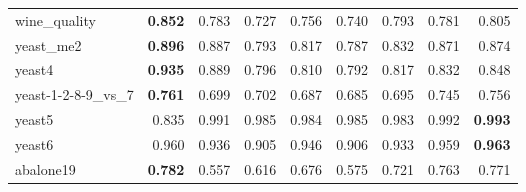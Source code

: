 \begin{table}[!htbp]
{\begin{tabular}{lrrrrrrrr}
			wine\_quality & \textbf{0.852} & 0.783 & 0.727 & 0.756 & 0.740 & 0.793 & 0.781 & 0.805 \\
			yeast\_me2 & \textbf{0.896} & 0.887 & 0.793 & 0.817 & 0.787 & 0.832 & 0.871 & 0.874 \\
			yeast4 & \textbf{0.935} & 0.889 & 0.796 & 0.810 & 0.792 & 0.817 & 0.832 & 0.848 \\
			yeast-1-2-8-9\_vs\_7 & \textbf{0.761} & 0.699 & 0.702 & 0.687 & 0.685 & 0.695 & 0.745 & 0.756 \\
			yeast5 & 0.835 & 0.991 & 0.985 & 0.984 & 0.985 & 0.983 & 0.992 & \textbf{0.993} \\
			yeast6 & 0.960 & 0.936 & 0.905 & 0.946 & 0.906 & 0.933 & 0.959 & \textbf{0.963} \\
			abalone19 & \textbf{0.782} & 0.557 & 0.616 & 0.676 & 0.575 & 0.721 & 0.763 & 0.771 \\
			\bottomrule
		\end{tabular}%
		
	}
	\label{tab:AUCAllDatasets}%
\end{table}%



